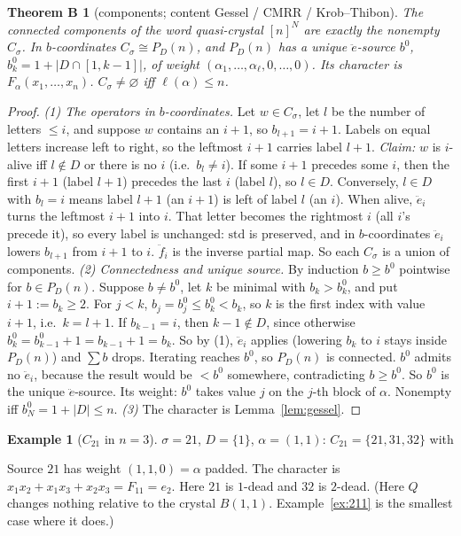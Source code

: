 \documentclass[11pt]{amsart}
\newtheorem*{theoremB}{Theorem B}
\theoremstyle{definition}
\newtheorem{example}[theorem]{Example}
\theoremstyle{remark}
\newcommand{\ee}{\ddot e}
\newcommand{\ff}{\ddot f}
\newcommand{\std}{\mathrm{std}}
\begin{document}
\begin{theoremB}[components; content Gessel / CMRR / Krob--Thibon]
The connected components of the word quasi-crystal $[n]^N$ are exactly the nonempty $C_\sigma$. In $b$-coordinates $C_\sigma\cong P_D(n)$, and $P_D(n)$ has a unique $\ee$-source $b^0$, $b^0_k=1+|D\cap[1,k-1]|$, of weight $(\alpha_1,\dots,\alpha_\ell,0,\dots,0)$. Its character is $F_\alpha(x_1,\dots,x_n)$. $C_\sigma\ne\varnothing$ iff $\ell(\alpha)\le n$.
\end{theoremB}
\begin{proof}
\emph{(1) The operators in $b$-coordinates.} Let $w\in C_\sigma$, let $l$ be the number of letters $\le i$, and suppose $w$ contains an $i+1$, so $b_{l+1}=i+1$. Labels on equal letters increase left to right, so the leftmost $i+1$ carries label $l+1$. \emph{Claim:} $w$ is $i$-alive iff $l\notin D$ or there is no $i$ (i.e.\ $b_l\ne i$). If some $i+1$ precedes some $i$, then the first $i+1$ (label $l+1$) precedes the last $i$ (label $l$), so $l\in D$. Conversely, $l\in D$ with $b_l=i$ means label $l+1$ (an $i+1$) is left of label $l$ (an $i$). When alive, $\ee_i$ turns the leftmost $i+1$ into $i$. That letter becomes the rightmost $i$ (all $i$'s precede it), so every label is unchanged: $\std$ is preserved, and in $b$-coordinates $\ee_i$ lowers $b_{l+1}$ from $i+1$ to $i$. $\ff_i$ is the inverse partial map. So each $C_\sigma$ is a union of components.
\emph{(2) Connectedness and unique source.} By induction $b\ge b^0$ pointwise for $b\in P_D(n)$. Suppose $b\ne b^0$, let $k$ be minimal with $b_k>b^0_k$, and put $i+1:=b_k\ge2$. For $j<k$, $b_j=b^0_j\le b^0_k<b_k$, so $k$ is the first index with value $i+1$, i.e.\ $k=l+1$. If $b_{k-1}=i$, then $k-1\notin D$, since otherwise $b^0_k=b^0_{k-1}+1=b_{k-1}+1=b_k$. So by (1), $\ee_i$ applies (lowering $b_k$ to $i$ stays inside $P_D(n)$) and $\sum b$ drops. Iterating reaches $b^0$, so $P_D(n)$ is connected. $b^0$ admits no $\ee_i$, because the result would be $<b^0$ somewhere, contradicting $b\ge b^0$. So $b^0$ is the unique $\ee$-source. Its weight: $b^0$ takes value $j$ on the $j$-th block of $\alpha$. Nonempty iff $b^0_N=1+|D|\le n$.
\emph{(3)} The character is Lemma~\ref{lem:gessel}.
\end{proof}

\begin{example}[$C_{21}$ in $n=3$]
$\sigma=21$, $D=\{1\}$, $\alpha=(1,1)$: $C_{21}=\{21,31,32\}$ with
\begin{center}
\end{center}
Source $21$ has weight $(1,1,0)=\alpha$ padded. The character is $x_1x_2+x_1x_3+x_2x_3=F_{11}=e_2$. Here $21$ is $1$-dead and $32$ is $2$-dead. (Here $Q$ changes nothing relative to the crystal $B(1,1)$. Example~\ref{ex:211} is the smallest case where it does.)
\end{example}
\end{document}
